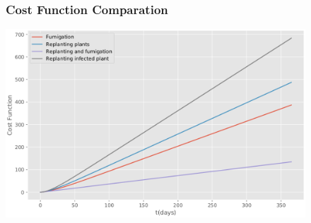 \begin{frame}
	\begin{figure}
		\frametitle{Cost Function Comparation}
		\centering	
		\includegraphics[width=\linewidth]{Feathergraphics/Cost_Comparation_version_2.eps}
	\end{figure}	
\end{frame}